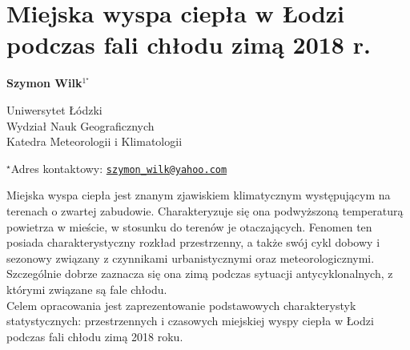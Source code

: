 \documentclass[\main/boa.tex]{subfiles}
\begin{document}
\section{Miejska wyspa ciepła w Łodzi podczas fali chłodu zimą 2018 r.}

\begin{center}
  {\bf {} Szymon Wilk$^{1^\star}$}
\end{center}

\vskip 0.3cm

\begin{affiliations}
\begin{enumerate}
\begin{minipage}{0.915\textwidth}
\centering
\item Uniwersytet Łódzki \\ Wydział Nauk Geograficznych \\ Katedra Meteorologii i Klimatologii\\[-2pt]
\end{minipage}
\end{enumerate}
$^\star$Adres kontaktowy: \href{mailto:szymon_wilk@yahoo.com}{\nolinkurl{szymon_wilk@yahoo.com}}\\
\end{affiliations}

\vskip 0.5cm


\vskip 0.5cm

Miejska wyspa ciepła jest znanym zjawiskiem klimatycznym występującym na terenach o zwartej zabudowie. Charakteryzuje się ona podwyższoną temperaturą powietrza w mieście, w stosunku do terenów je otaczających. Fenomen ten posiada charakterystyczny rozkład przestrzenny, a także swój cykl dobowy i sezonowy związany z czynnikami urbanistycznymi oraz meteorologicznymi. Szczególnie dobrze zaznacza się ona zimą podczas sytuacji antycyklonalnych, z którymi związane są fale chłodu.\\
	Celem opracowania jest zaprezentowanie podstawowych charakterystyk statystycznych: przestrzennych i czasowych miejskiej wyspy ciepła w Łodzi podczas fali chłodu zimą 2018 roku.
\end{document}
